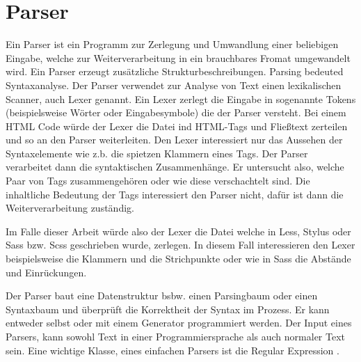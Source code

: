 \section{Parser}
Ein Parser ist ein Programm zur Zerlegung und Umwandlung einer beliebigen Eingabe, welche zur Weiterverarbeitung in ein brauchbares Fromat umgewandelt wird. Ein Parser erzeugt zusätzliche Strukturbeschreibungen. Parsing bedeuted Syntaxanalyse. \newline
Der Parser verwendet zur Analyse von Text einen lexikalischen Scanner, auch Lexer genannt. Ein Lexer zerlegt die Eingabe in sogenannte Tokens (beispielsweise Wörter oder Eingabesymbole) die der Parser versteht. \newline
Bei einem HTML Code würde der Lexer die Datei ind HTML-Tags und Fließtext zerteilen und so an den Parser weiterleiten. Den Lexer interessiert nur das Aussehen der Syntaxelemente wie z.b. die spietzen Klammern eines Tags. Der Parser verarbeitet dann die syntaktischen Zusammenhänge. Er untersucht also, welche Paar von Tags zusammengehören oder wie diese verschachtelt sind. Die inhaltliche Bedeutung der Tags interessiert den Parser nicht, dafür ist dann die Weiterverarbeitung zuständig.

Im Falle dieser Arbeit würde also der Lexer die Datei welche in Less, Stylus oder Sass bzw. Scss geschrieben wurde, zerlegen. In diesem Fall interessieren den Lexer beispielsweise die Klammern und die Strichpunkte oder wie in Sass die Abstände und Einrückungen.

Der Parser baut eine Datenstruktur bsbw. einen Parsingbaum oder einen Syntaxbaum und überprüft die Korrektheit der Syntax im Prozess. Er kann entweder selbst oder mit einem Generator programmiert werden. Der Input eines Parsers, kann sowohl Text in einer Programmiersprache als auch normaler Text sein. Eine wichtige Klasse, eines einfachen Parsers ist die \glqq{} Regular Expression \grqq{}.

